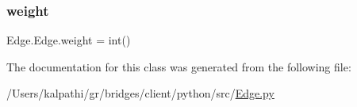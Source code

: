 \subsubsection{\texorpdfstring{weight}{weight}}
{\footnotesize\ttfamily Edge.\+Edge.\+weight = int()\hspace{0.3cm}{\ttfamily [static]}}



The documentation for this class was generated from the following file\+:\begin{DoxyCompactItemize}
\item 
/\+Users/kalpathi/gr/bridges/client/python/src/\hyperlink{_edge_8py}{Edge.\+py}\end{DoxyCompactItemize}
